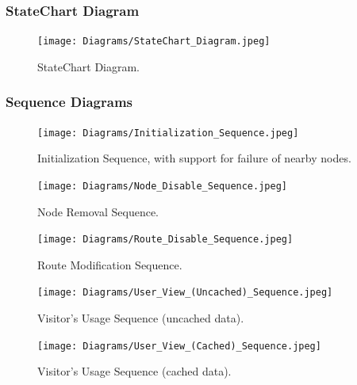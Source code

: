 \documentclass[twoside,a4paper,12pt]{book}
\begin{document}
\subsubsection{StateChart Diagram}
	\begin{figure}[!h]
		\begin{center}
			\texttt{[image: Diagrams/StateChart\_Diagram.jpeg]}
		\end{center}
		\caption{StateChart Diagram.}
	\end{figure}


\subsubsection{Sequence Diagrams}
	\begin{figure}[!h]
		\begin{center}
			\texttt{[image: Diagrams/Initialization\_Sequence.jpeg]}
		\end{center}
		\caption{Initialization Sequence, with support for failure of nearby nodes.}
	\end{figure}
	
\newpage

	\begin{figure}[!h]
		\begin{center}
			\texttt{[image: Diagrams/Node\_Disable\_Sequence.jpeg]}
		\end{center}
		\caption{Node Removal Sequence.}
	\end{figure}

	\begin{figure}[!h]
		\begin{center}
			\texttt{[image: Diagrams/Route\_Disable\_Sequence.jpeg]}
		\end{center}
		\caption{Route Modification Sequence.}
	\end{figure}
		
\newpage

	\begin{figure}[!h]
		\begin{center}
			\texttt{[image: Diagrams/User\_View\_(Uncached)\_Sequence.jpeg]}
		\end{center}
		\caption{Visitor's Usage Sequence (uncached data).}
	\end{figure}
	\begin{figure}[!h]
		\begin{center}
			\texttt{[image: Diagrams/User\_View\_(Cached)\_Sequence.jpeg]}
		\end{center}
		\caption{Visitor's Usage Sequence (cached data).}
	\end{figure}
\newpage
\end{document}
